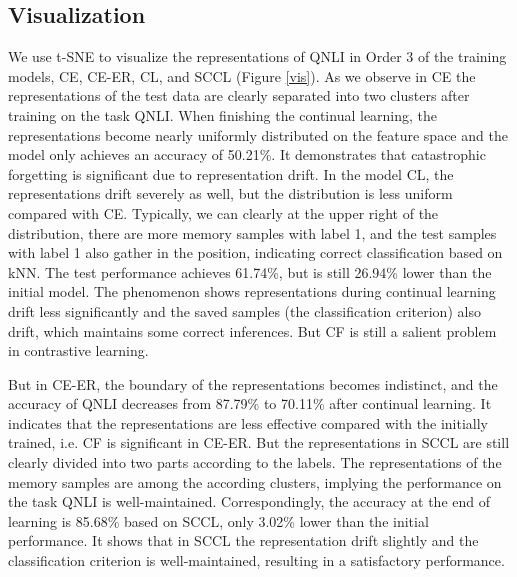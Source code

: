 \subsection{Visualization}
We use t-SNE to  visualize the representations of QNLI in Order 3 of the training models, CE, CE-ER, CL, and SCCL (Figure \ref{vis}). As we observe in CE the representations of the test data are clearly separated into two clusters after training on the task QNLI. When finishing the continual learning, the representations become nearly uniformly distributed on the feature space and the model only achieves an accuracy of 50.21\%. It demonstrates that catastrophic forgetting is significant due to representation drift. In the model CL, the representations drift severely as well, but the distribution is less uniform compared with CE. Typically, we can clearly at the upper right of the distribution, there are more memory samples with label 1, and the test samples with label 1 also gather in the position, indicating correct classification based on kNN. The test performance achieves 61.74\%, but is still 26.94\% lower than the initial model. The phenomenon shows representations during continual learning drift less significantly and the saved samples (the classification criterion) also drift, which maintains some correct inferences. But CF is still a salient problem in contrastive learning.

But in CE-ER, the boundary of the representations becomes indistinct, and the accuracy of QNLI decreases from 87.79\% to 70.11\% after continual learning. It indicates that the representations are less effective compared with the initially trained, i.e. CF is significant in CE-ER. But the representations in SCCL are  still clearly divided into two parts according to the labels. The representations of the memory samples are among the according clusters, implying the performance on the task QNLI is well-maintained. Correspondingly, the accuracy at the end of learning is 85.68\% based on SCCL, only 3.02\% lower than the initial performance. It shows that in SCCL the representation drift slightly and the classification criterion is well-maintained, resulting in a satisfactory performance. 






